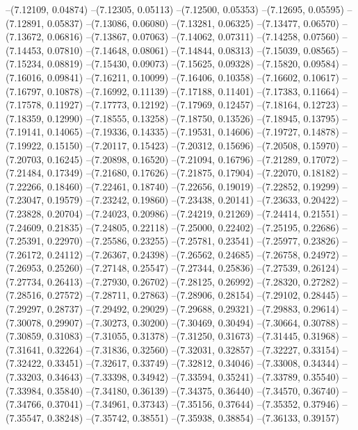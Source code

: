 --(7.12109, 0.04874)
--(7.12305, 0.05113)
--(7.12500, 0.05353)
--(7.12695, 0.05595)
--(7.12891, 0.05837)
--(7.13086, 0.06080)
--(7.13281, 0.06325)
--(7.13477, 0.06570)
--(7.13672, 0.06816)
--(7.13867, 0.07063)
--(7.14062, 0.07311)
--(7.14258, 0.07560)
--(7.14453, 0.07810)
--(7.14648, 0.08061)
--(7.14844, 0.08313)
--(7.15039, 0.08565)
--(7.15234, 0.08819)
--(7.15430, 0.09073)
--(7.15625, 0.09328)
--(7.15820, 0.09584)
--(7.16016, 0.09841)
--(7.16211, 0.10099)
--(7.16406, 0.10358)
--(7.16602, 0.10617)
--(7.16797, 0.10878)
--(7.16992, 0.11139)
--(7.17188, 0.11401)
--(7.17383, 0.11664)
--(7.17578, 0.11927)
--(7.17773, 0.12192)
--(7.17969, 0.12457)
--(7.18164, 0.12723)
--(7.18359, 0.12990)
--(7.18555, 0.13258)
--(7.18750, 0.13526)
--(7.18945, 0.13795)
--(7.19141, 0.14065)
--(7.19336, 0.14335)
--(7.19531, 0.14606)
--(7.19727, 0.14878)
--(7.19922, 0.15150)
--(7.20117, 0.15423)
--(7.20312, 0.15696)
--(7.20508, 0.15970)
--(7.20703, 0.16245)
--(7.20898, 0.16520)
--(7.21094, 0.16796)
--(7.21289, 0.17072)
--(7.21484, 0.17349)
--(7.21680, 0.17626)
--(7.21875, 0.17904)
--(7.22070, 0.18182)
--(7.22266, 0.18460)
--(7.22461, 0.18740)
--(7.22656, 0.19019)
--(7.22852, 0.19299)
--(7.23047, 0.19579)
--(7.23242, 0.19860)
--(7.23438, 0.20141)
--(7.23633, 0.20422)
--(7.23828, 0.20704)
--(7.24023, 0.20986)
--(7.24219, 0.21269)
--(7.24414, 0.21551)
--(7.24609, 0.21835)
--(7.24805, 0.22118)
--(7.25000, 0.22402)
--(7.25195, 0.22686)
--(7.25391, 0.22970)
--(7.25586, 0.23255)
--(7.25781, 0.23541)
--(7.25977, 0.23826)
--(7.26172, 0.24112)
--(7.26367, 0.24398)
--(7.26562, 0.24685)
--(7.26758, 0.24972)
--(7.26953, 0.25260)
--(7.27148, 0.25547)
--(7.27344, 0.25836)
--(7.27539, 0.26124)
--(7.27734, 0.26413)
--(7.27930, 0.26702)
--(7.28125, 0.26992)
--(7.28320, 0.27282)
--(7.28516, 0.27572)
--(7.28711, 0.27863)
--(7.28906, 0.28154)
--(7.29102, 0.28445)
--(7.29297, 0.28737)
--(7.29492, 0.29029)
--(7.29688, 0.29321)
--(7.29883, 0.29614)
--(7.30078, 0.29907)
--(7.30273, 0.30200)
--(7.30469, 0.30494)
--(7.30664, 0.30788)
--(7.30859, 0.31083)
--(7.31055, 0.31378)
--(7.31250, 0.31673)
--(7.31445, 0.31968)
--(7.31641, 0.32264)
--(7.31836, 0.32560)
--(7.32031, 0.32857)
--(7.32227, 0.33154)
--(7.32422, 0.33451)
--(7.32617, 0.33749)
--(7.32812, 0.34046)
--(7.33008, 0.34344)
--(7.33203, 0.34643)
--(7.33398, 0.34942)
--(7.33594, 0.35241)
--(7.33789, 0.35540)
--(7.33984, 0.35840)
--(7.34180, 0.36139)
--(7.34375, 0.36440)
--(7.34570, 0.36740)
--(7.34766, 0.37041)
--(7.34961, 0.37343)
--(7.35156, 0.37644)
--(7.35352, 0.37946)
--(7.35547, 0.38248)
--(7.35742, 0.38551)
--(7.35938, 0.38854)
--(7.36133, 0.39157)

